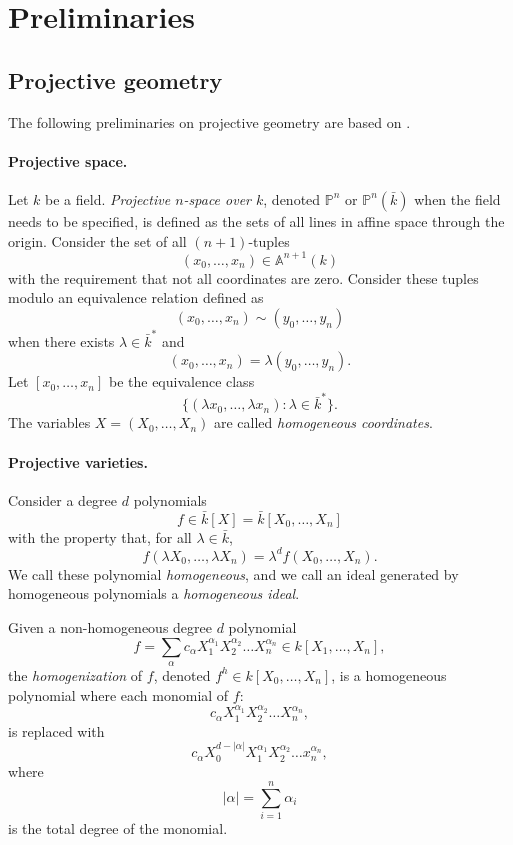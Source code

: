 \documentclass[12pt]{article}
\begin{document}
\section{Preliminaries}






\subsection{Projective geometry}


The following preliminaries on projective geometry are based on \cite[Chapter 1]{silverman}. 
    



\paragraph*{Projective space.} 
Let $k$ be a field. \textit{Projective \(n\)-space over $k$}, denoted $\mathbb{P}^n$ or $\mathbb{P}^n(\bar{k})$ when the field needs to be specified, is defined as the sets of all lines in affine space through the origin. Consider the set of all $(n+1)$-tuples
\[
(x_0, \dots, x_n) \in \mathbb{A}^{n+1}(k)
\]
with the requirement that not all coordinates are zero. Consider these tuples modulo an equivalence relation defined as
\[
(x_0, \dots, x_n) \sim (y_0, \dots, y_n)
\]    
when there exists \(\lambda \in \bar{k}^*\) and \[(x_0,\hdots,x_n) = \lambda (y_0,\hdots,y_n).\] 
%
Let $[x_0, \dots, x_n]$ be the equivalence class
\[
\{ (\lambda x_0, \dots, \lambda x_n) : \lambda \in \bar{k}^* \}.
\]
The variables  $ X = (X_0, \dots, X_n)$ are  called \textit{homogeneous coordinates}. 






\paragraph*{Projective varieties.}
Consider a degree $d$ polynomials 
\[
f \in \bar{k}[X] = \bar{k}[X_0, \dots, X_n]\] with the property that, for all $\lambda \in \bar{k}$, 
\[
f(\lambda X_0, \dots, \lambda X_n) = \lambda^d f(X_0, \dots, X_n).
\]
We call these polynomial \textit{homogeneous}, and we call an ideal generated by homogeneous polynomials a \textit{homogeneous ideal}.


Given a non-homogeneous degree $d$ polynomial 
\[
f = \sum_{\alpha} c_{\alpha} X_1^{\alpha_1} X_2^{\alpha_2} \dots X_n^{\alpha_n} \in k[X_1,\hdots,X_n],
\]
the \textit{homogenization} of $f$, denoted $f^h \in k[X_0,\hdots,X_n]$, is a homogeneous polynomial where
each monomial of $f$:
\[
c_{\alpha} X_1^{\alpha_1} X_2^{\alpha_2} \dots X_n^{\alpha_n},
\] is replaced with 
\[
c_{\alpha} X_0^{d - |\alpha|} X_1^{\alpha_1} X_2^{\alpha_2} \dots x_n^{\alpha_n},
\]
where \[|\alpha| = \sum_{i=1}^{n} \alpha_i\] is the total degree of the monomial. 
\end{document}
